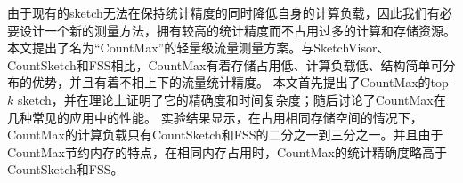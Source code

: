 由于现有的sketch无法在保持统计精度的同时降低自身的计算负载，因此我们有必要设计一个新的测量方法，拥有较高的统计精度而不占用过多的计算和存储资源。
本文提出了名为“CountMax”的轻量级流量测量方案。与SketchVisor、CountSketch和FSS相比，CountMax有着存储占用低、计算负载低、结构简单可分布的优势，并且有着不相上下的流量统计精度。
本文首先提出了CountMax的top-$k$ sketch，并在理论上证明了它的精确度和时间复杂度；随后讨论了CountMax在几种常见的应用中的性能。
实验结果显示，在占用相同存储空间的情况下，CountMax的计算负载只有CountSketch和FSS的二分之一到三分之一。并且由于CountMax节约内存的特点，在相同内存占用时，CountMax的统计精确度略高于CountSketch和FSS。



